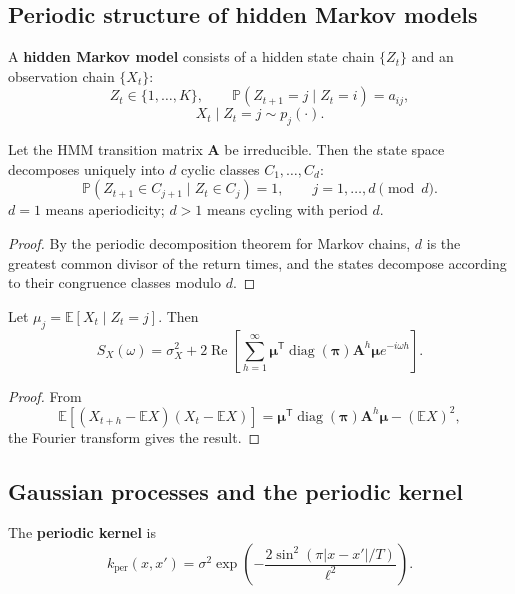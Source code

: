 \subsection{Periodic structure of hidden Markov models}

\begin{definition}\label{def:hmm}
A \textbf{hidden Markov model} consists of a hidden state chain $\{Z_t\}$ and an observation chain $\{X_t\}$:
\[
Z_t\in\{1,\dots,K\},\qquad \mathbb P(Z_{t+1}=j\mid Z_t=i)=a_{ij},
\]
\[
X_t\mid Z_t=j\sim p_j(\cdot).
\]
\end{definition}

\begin{theorem}\label{thm:hmm_period}
Let the HMM transition matrix $\mathbf A$ be irreducible. Then the state space decomposes uniquely into $d$ cyclic classes $C_1,\dots,C_d$:
\[
\mathbb P(Z_{t+1}\in C_{j+1}\mid Z_t\in C_j)=1,\qquad j=1,\dots,d\pmod d.
\]
$d=1$ means aperiodicity; $d>1$ means cycling with period $d$.
\end{theorem}

\begin{proof}
By the periodic decomposition theorem for Markov chains, $d$ is the greatest common divisor of the return times, and the states decompose according to their congruence classes modulo $d$.
\end{proof}

\begin{proposition}\label{prop:hmm_spectrum}
Let $\mu_j=\mathbb E[X_t\mid Z_t=j]$. Then
\[
S_X(\omega)=\sigma_X^2+2\operatorname{Re}\left[\sum_{h=1}^\infty\boldsymbol\mu^{\mathsf T}\operatorname{diag}(\boldsymbol\pi)\mathbf A^h\boldsymbol\mu e^{-i\omega h}\right].
\]
\end{proposition}

\begin{proof}
From
\[
\mathbb E[(X_{t+h}-\mathbb EX)(X_t-\mathbb EX)]
=\boldsymbol\mu^{\mathsf T}\operatorname{diag}(\boldsymbol\pi)\mathbf A^h\boldsymbol\mu-(\mathbb EX)^2,
\]
the Fourier transform gives the result.
\end{proof}

\subsection{Gaussian processes and the periodic kernel}

\begin{definition}\label{def:periodic_kernel}
The \textbf{periodic kernel} is
\[
k_{\mathrm{per}}(x,x')=\sigma^2\exp\left(-\frac{2\sin^2(\pi|x-x'|/T)}{\ell^2}\right).
\]
\end{definition}

